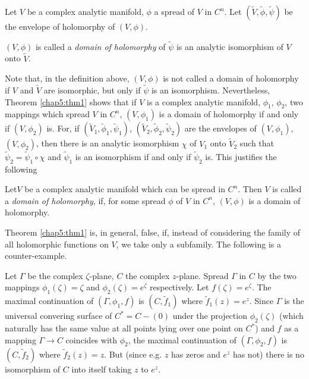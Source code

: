 \begin{defn}\label{chap5:def1}
Let $V$ be a complex analytic manifold, $\phi$ a spread of $V$ in
$C^n$. Let $(\tilde{V}, \tilde{\phi}, \tilde{\psi})$ be the envelope
of holomorphy of $(V, \phi)$. 

$(V, \phi)$ is called a \textit{domain of holomorphy} of
$\tilde{\psi}$ is an analytic isomorphism of $V$ onto $\tilde{V}$.

Note that, in the definition above, $(V, \phi)$ is not called a domain
of holomorphy if $V$ and $\tilde{V}$ are isomorphic, but only if
$\tilde{\psi}$ is an isomorphism. Nevertheless, Theorem
\ref{chap5:thm1} shows that 
if $V$ is a complex analytic manifold, $\phi_1$, $\phi_2$, two
mappings which spread $V$ in $C^n$, $(V, \phi_1)$ is a domain of
holomorphy if and only if $(V, \phi_2)$ is. For, if $(\tilde{V}_1,
\tilde{\phi}_1, \tilde{\psi}_1)$, $(\tilde{V}_2, \tilde{\phi}_2,
\tilde{\psi}_2)$ are the envelopes of $(V, \phi_1)$, $(V, \phi_2)$,
then there is an analytic isomorphism $\chi$ of $V_1$ onto
$\tilde{V}_2$ such that $\tilde{\psi}_2 = \tilde{\psi}_1 \circ \chi$
and $\tilde{\psi}_1$ is an isomorphism if and only if $\tilde{\psi}_2$
is. This justifies the following 
\end{defn}


\begin{defn}\label{chap5:def2}
Let\pageoriginale $V$ be a complex analytic manifold which can be
spread in $C^n$. Then $V$ is called a \textit{domain of holomorphy},
if, for some spread $\phi$ of $V$ in $C^n$, $(V, \phi)$ is a domain of
holomorphy.
\end{defn}

Theorem \ref{chap5:thm1} is, in general, false, if, instead of
considering the family 
of all holomorphic functions on $V$, we take only a subfamily. The
following is a counter-example.

Let $\Gamma$ be the complex $\zeta$-plane, $C$ the complex
$z$-plane. Spread $\Gamma$ in $C$ by the two mappings $\phi_1 (\zeta)
= \zeta$ and $\phi_2 (\zeta) = e^\zeta$ respectively. Let $f(\zeta) =
e^{\zeta}$. The maximal continuation of $(\Gamma, \phi_1, f)$ is $(C,
\tilde{f}_1)$  where $\tilde{f}_1 (z) = e^z$. Since $\Gamma$ is the
universal convering surface of $C^\ast = C-(0)$ under the projection
$\phi_2 (\zeta)$ (which naturally has the same value at all points
lying over one point on $C^\ast$) and $f$ as a mapping $\Gamma \to C$
coincides with $\phi_2$, the maximal continuation of $(\Gamma, \phi_2,
f)$ is $(C, \tilde{f}_2)$ where $\tilde{f}_2(z)=z$. But (since
e.g. $z$ has zeros and $e^z$ has not) there is no isomorphism of $C$
into itself taking $z$ to $e^z$.
